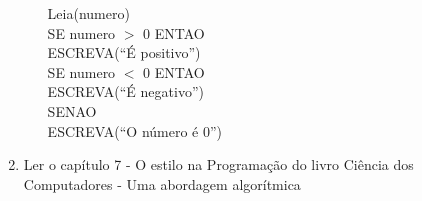 \documentclass[a4paper, 12pt]{article}
\begin{document}
\begin{enumerate}
\begin{itemize}
Leia(numero)\\

SE numero $>$ 0 ENTAO\\
ESCREVA(``É positivo'')\\
SE numero $<$ 0 ENTAO\\
ESCREVA(``É negativo'')\\
SENAO\\
ESCREVA(``O número é 0'')\\

  
  \end{itemize}
\item Ler o capítulo 7 - O estilo na Programação do livro Ciência dos Computadores - Uma abordagem algorítmica
\end{enumerate}
\end{document}
